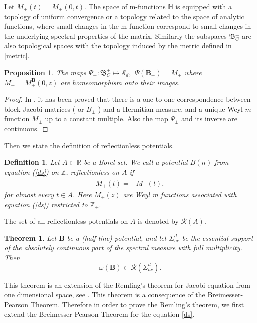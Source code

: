 \documentclass[reqno]{amsart}
\numberwithin{equation}{section}
\newcommand{\R}{\mathbb{R}}
\newcommand{\Z}{\mathbb{Z}}
\newtheorem{theorem}{Theorem}[section]
\newtheorem{prop}{Proposition}[section]
\newtheorem{defi}{Definition}[section]
\begin{document}
 Let  $ M_{\pm}(t) = M_{\pm}(0, t) .$  The space of m-functions $ \mathbb H$ is   equipped with a topology of uniform convergence or a topology related to the space of analytic functions, where small changes in the m-function correspond to small changes in the underlying spectral properties of the matrix. Similarly the subspaces $\mathfrak B_C^{\pm}$ are also topological spaces with the topology induced by the metric defined in \eqref{metric}.
 
 \begin{prop}  \cite{MM}\label{prop 4.1} The maps  $ \Psi_{\pm} : \mathfrak B_C^{\pm}  \mapsto \mathcal S_d, \ \  \Psi ( \mathbf B_{\pm}) =  M_{\pm}$ where $  M_{\pm} = M_{\pm}^\mathbf B (0,z) $  are homeomorphism onto their images. \end{prop}
 \begin{proof} In \cite{MM}, it has been proved that there is a one-to-one correspondence between block Jacobi matrices ( or $B_{\pm}$ ) and a Hermitian measure, and a unique Weyl-$m$ function $M_{\pm}$ up to a constant multiple. Also the map $ \Psi_{\pm} $ and its inverse are continuous.     \end{proof}
 
 
 
 Then we state the definition of reflectionless potentials.
\
\begin{defi} Let $A\subset\R$ be a Borel set. We call a potential $ B(n) $ from equation (\ref{ds}) on $\Z$, reflectionless on $A$ if
	\begin{align}\label{ref}
    M_{+}(t)=-\overline{M_{-}(t)},
    \end{align}
    for almost every  $ t\in A$. Here  $M_{\pm}(z)$ are Weyl m functions associated with equation (\ref{ds}) restricted to $\Z_{\pm}.$
\end{defi}
The set of all reflectionless potentials on $A$ is denoted by $\mathcal R(A).$ 



\begin{theorem}
	\label{RT} Let $\mathbf B $  be a (half line)
	potential, and let $\Sigma_{ac}^d$ be the essential support of the 	absolutely continuous part of the spectral measure with full multiplicity. Then \[
	\omega(\mathbf  B)\subset \mathcal R ( \Sigma_{ac}^d).\] \end{theorem} 
This theorem is an extension of the Remling's theorem for Jacobi equation from one dimensional space, see \cite{CR1}. This theorem is a consequence of the  Breimesser-Pearson Theorem. Therefore in order to prove the Remling's theorem, we first extend  the Breimesser-Pearson Theorem for the equation \eqref{ds}.\\
\end{document}
